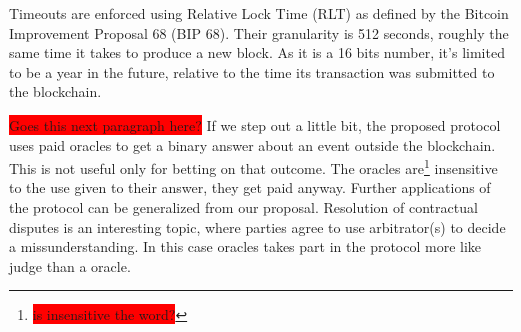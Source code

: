 Timeouts are enforced using Relative Lock Time (RLT) as defined by the Bitcoin
  Improvement Proposal 68 (BIP 68). Their granularity is 512 seconds, roughly
  the same time it takes to produce a new block.
As it is a 16 bits number, it's limited to be a year in the future, relative to
  the time its transaction was submitted to the blockchain.


\colorbox{red}{Goes this next paragraph here?}
If we step out a little bit, the proposed protocol uses paid oracles to get a
  binary answer about an event outside the blockchain. This is not useful only
  for betting on that outcome. The oracles are\footnote{\colorbox{red}{%
  is insensitive the word?}} insensitive to the use given to their answer, they
  get paid anyway. Further applications of the protocol can be generalized from
  our proposal.
Resolution of contractual disputes is an interesting topic, where parties agree
  to use arbitrator(s) to decide a missunderstanding.
In this case oracles takes part in the protocol more like judge than a oracle.
